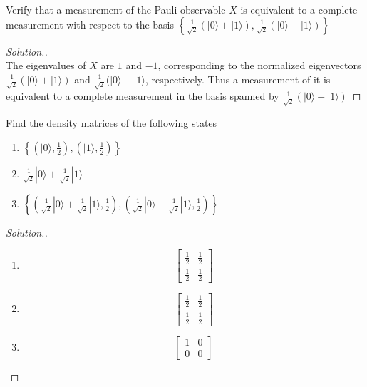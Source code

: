 \documentclass[12pt]{article}
\newenvironment{problem}[2][Problem]{\begin{trivlist}
\item[\hskip \labelsep {\bfseries #1}\hskip \labelsep {\bfseries #2.}]}{\end{trivlist}}
\begin{document}
\begin{problem}{3.4.3}
Verify that a measurement of the Pauli observable $X$ is equivalent to a
complete measurement with respect to the basis $\left\lbrace\frac{1}{\sqrt{2}}(|0\rangle+|1\rangle),\frac{1}{\sqrt{2}}(|0\rangle-|1\rangle)\right\rbrace$
\end{problem}

\begin{proof}[Solution.]~\\
The eigenvalues of $X$ are $1$ and $-1$, corresponding to the normalized eigenvectors
$\frac{1}{\sqrt{2}}(|0\rangle+|1\rangle)$ and $\frac{1}{\sqrt{2}}(|0\rangle-|1\rangle$, respectively. Thus a measurement of it is
equivalent to a complete measurement in the basis spanned by $\frac{1}{\sqrt{2}}(|0\rangle\pm|1\rangle)$
\end{proof}

\begin{problem}{3.5.1}
Find the density matrices of the following states
\begin{enumerate}[label=(\alph*)]
\item $\left\lbrace(|0\rangle,\frac{1}{2}),(|1\rangle,\frac{1}{2})\right\rbrace$
\item $\frac{1}{\sqrt{2}}|0\rangle+\frac{1}{\sqrt{2}}|1\rangle$
\item $\left\lbrace(\frac{1}{\sqrt{2}}|0\rangle+\frac{1}{\sqrt{2}}|1\rangle,\frac{1}{2}),(\frac{1}{\sqrt{2}}|0\rangle-\frac{1}{\sqrt{2}}|1\rangle,\frac{1}{2})\right\rbrace$
\end{enumerate}
\end{problem}

\begin{proof}[Solution.]~\\
\begin{enumerate}[label=(\alph*)]
\item $$\begin{bmatrix}
\frac{1}{2} & \frac{1}{2}\\
\frac{1}{2} & \frac{1}{2}
\end{bmatrix}$$
\item $$\begin{bmatrix}
\frac{1}{2} & \frac{1}{2}\\
\frac{1}{2} & \frac{1}{2}
\end{bmatrix}$$
\item $$\begin{bmatrix}
1 & 0\\
0 & 0
\end{bmatrix}$$
\end{enumerate}
\end{proof}
 
\end{document}
